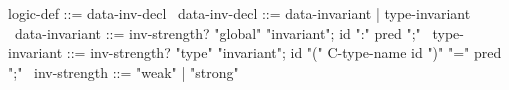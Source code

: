 \begin{syntax}
  logic-def ::= data-inv-decl
  \
  data-inv-decl ::= data-invariant | type-invariant
  \
  data-invariant ::= {inv-strength?} "global" "invariant";
                      id ":" pred ";"
  \
  type-invariant ::= {inv-strength?} "type" "invariant";
                      id "(" C-type-name id ")" "=" pred ";"
  \
  {inv-strength} ::= { "weak" } | { "strong" }
\end{syntax}
